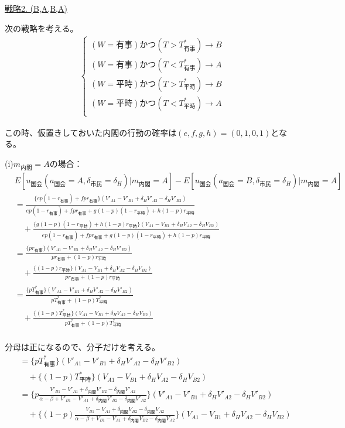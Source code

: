 \documentclass[main.tex]{subfiles}
\begin{document}
\bigskip
\noindent
\underline{戦略2. (B,A,B,A)}

次の戦略を考える。
\begin{align*}
    \begin{cases}
        (W=有事) かつ (T>T^*_{有事})  \rightarrow B\\
        (W=有事) かつ (T<T^*_{有事})  \rightarrow A\\
        (W=平時) かつ (T>T^*_{平時})  \rightarrow B\\
        (W=平時) かつ (T<T^*_{平時})   \rightarrow A\\
    \end{cases}
\end{align*}

この時、仮置きしておいた内閣の行動の確率は$(e,f,g,h) = (0,1,0,1)$となる。



(i)$m_{内閣}=A$の場合：
\begin{align*}
    & E[u_{国会}(a_{国会}=A, \delta_{市民}=\delta_H) | m_{内閣} = A  ] - E[u_{国会}(a_{国会}=B, \delta_{市民}=\delta_H) | m_{内閣} = A  ]\\[1em]
    &= \frac{ \{ep(1-r_{有事}) +  fpr_{有事}\}(V'_{A1} -V'_{B1} + \delta_H V'_{A2} - \delta_H V'_{B2})  }{ ep(1-r_{有事}) + fpr_{有事} + g(1-p)(1-r_{平時}) + h(1-p)r_{平時} }\\[1em]
    &\quad + \frac{ \{g(1-p)(1-r_{平時}) + h(1-p)r_{平時}\}(V_{A1} - V_{B1} + \delta_H V_{A2} - \delta_H V_{B2} ) }{ ep(1-r_{有事}) + fpr_{有事} + g(1-p)(1-r_{平時}) + h(1-p)r_{平時} }\\[1em]
    &= \frac{ \{ pr_{有事}\}(V'_{A1} -V'_{B1} + \delta_H V'_{A2} - \delta_H V'_{B2})  }{ pr_{有事} + (1-p)r_{平時} }\\[1em]
    &\quad + \frac{ \{(1-p)r_{平時}\}(V_{A1} - V_{B1} + \delta_H V_{A2} - \delta_H V_{B2} ) }{ pr_{有事} + (1-p)r_{平時} }\\[1em]
    &= \frac{ \{ pT^*_{有事}\}(V'_{A1} -V'_{B1} + \delta_H V'_{A2} - \delta_H V'_{B2})  }{ pT^*_{有事} + (1-p)T^*_{平時} }\\[1em]
    &\quad + \frac{ \{(1-p)T^*_{平時}\}(V_{A1} - V_{B1} + \delta_H V_{A2} - \delta_H V_{B2} ) }{ pT^*_{有事} + (1-p)T^*_{平時} }\\[1em]
\end{align*}


分母は正になるので、分子だけを考える。
\begin{align*}
    &= \{ pT^*_{有事}\}(V'_{A1} -V'_{B1} + \delta_H V'_{A2} - \delta_H V'_{B2})\\[1em]
    &\quad + \{(1-p)T^*_{平時}\}(V_{A1} - V_{B1} + \delta_H V_{A2} - \delta_H V_{B2} )\\[1em]
    &= \{ p \frac{ V'_{B1} - V'_{A1} +\delta_{内閣}V'_{B2} - \delta_{内閣}V'_{A2} }{ \alpha-\beta + V'_{B1}-V'_{A1} + \delta_{内閣}V'_{B2} - \delta_{内閣}V'_{A2} } \}(V'_{A1} -V'_{B1} + \delta_H V'_{A2} - \delta_H V'_{B2})\\[1em]
    &\quad + \{(1-p) \frac{ V_{B1} - V_{A1} +\delta_{内閣}V_{B2} - \delta_{内閣}V_{A2} }{ \alpha-\beta + V_{B1}-V_{A1} + \delta_{内閣}V_{B2} - \delta_{内閣}V_{A2} } \}(V_{A1} - V_{B1} + \delta_H V_{A2} - \delta_H V_{B2} )\\[1em]
\end{align*}
\end{document}
